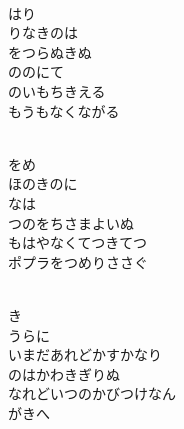 \documentclass[10pt,b5j]{tarticle} %
\begin{document}
\vspace{1.5em} %
\newcommand{\linespace}{0.5em} %
\newcommand{\blocksize}{0.33\hsize} %
\newcommand{\itemmargin}{3em} %
\begin{enumerate} %
    \setlength{\itemindent}{\itemmargin} %
    \begin{minipage}[c]{\blocksize}
    
        \vspace{\linespace}
        \item~\\
        はり\\
        りなきのは\\
        をつらぬきぬ\\
        ののにて\\
        のいもちきえる\\
        もうもなくながる
        
        \vspace{\linespace}
        \item~\\
        をめ\\
        ほのきのに\\
        なは\\
        つのをちさまよいぬ\\
        もはやなくてつきてつ\\
        ポプラをつめりささぐ
        
    \end{minipage}
    \begin{minipage}[c]{\blocksize}
        
        \vspace{\linespace}
        \item~\\
        き\\
        うらに\\
        いまだあれどかすかなり\\
        のはかわきぎりぬ\\
        なれどいつのかびつけなん\\
        がきへ
        

\end{minipage}
\end{enumerate}
\end{document}
